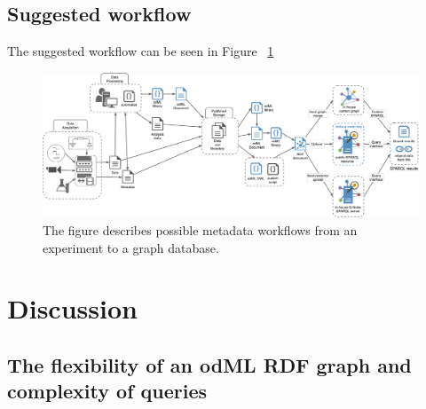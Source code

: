 \documentclass{article}
\begin{document}
\subsection{Suggested workflow} \label{sec:odml_rdf_workflow}

The suggested workflow can be seen in Figure ~\ref{fig:workflowSchema}

\begin{figure}
\begin{center}
\includegraphics[width=0.90\columnwidth]{figures/workflowSchema.pdf}
\caption{The figure describes possible metadata workflows from an experiment to a graph database.}
\label{fig:workflowSchema}
\end{center}
\end{figure}

\section{Discussion}

\subsection{The flexibility of an odML RDF graph and complexity of queries}
\end{document}

